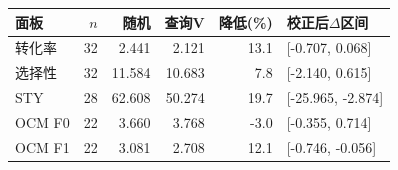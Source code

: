 \begin{tabular}{lrrrrl}\toprule 面板 & $n$ & 随机 & 查询V & 降低(\%) & 校正后$\Delta$区间\\\midrule
转化率 & 32 & 2.441 & 2.121 & 13.1 & [-0.707, 0.068]\\
选择性 & 32 & 11.584 & 10.683 & 7.8 & [-2.140, 0.615]\\
STY & 28 & 62.608 & 50.274 & 19.7 & [-25.965, -2.874]\\
OCM F0 & 22 & 3.660 & 3.768 & -3.0 & [-0.355, 0.714]\\
OCM F1 & 22 & 3.081 & 2.708 & 12.1 & [-0.746, -0.056]\\
\bottomrule\end{tabular}
